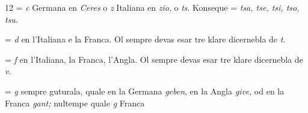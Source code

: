 \begin{VUpage}[16]{12}
\VUblanc{2.82pt}%
 = \textit{c} Germana en \textit{Ceres} o \textit{z} Italiana en \textit{zio}, o \textit{ts}. Konseque\nl
{} = \textit{tsa, tse, tsi, tso, tsu.}

\VUblancAlinea
{} = \textit{d} en l'Italiana e la Franca. Ol sempre devas esar\nl
tre klare dicernebla de \textit{t}.

\VUblancAlinea
{} = \textit{f} en l'Italiana, la Franca, l'Angla. Ol sempre devas\nl
esar tre klare dicernebla de \textit{v}.

\VUblancAlinea

\VUblancAlinea
{} = \textit{g} sempre guturala, quale en la Germana \textit{geben}, en la\nl
Angla \textit{give}, od en la Franca \textit{gant;} nultempe quale \textit{g} Franca
\parplein
\end{VUpage}

